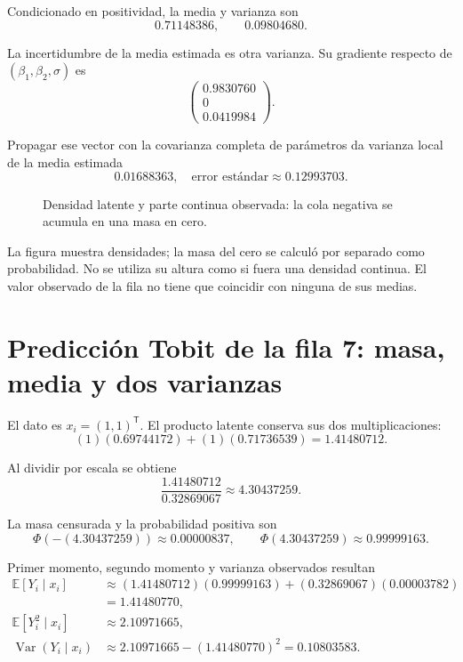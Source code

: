 \documentclass[11pt,a4paper]{article}
\newcommand{\E}{\mathbb E}
\newcommand{\T}{^{\mathsf T}}
\DeclareMathOperator{\Var}{Var}
\begin{document}
Condicionado en positividad,
la media y varianza son
\[
0.71148386,\qquad 0.09804680.
\]

La incertidumbre de la media estimada
es otra varianza.
Su gradiente respecto de
\((\beta_1,\beta_2,\sigma)\) es
\[
\begin{pmatrix}0.9830760\\0\\0.0419984\end{pmatrix}.
\]

Propagar ese vector con la
covarianza completa de parámetros
da varianza local de la
media estimada
\[
0.01688363,\quad\text{error estándar}\approx0.12993703.
\]

\begin{figure}[H]\centering
{}
\caption{Densidad latente y parte continua observada: la cola negativa se acumula en una masa en cero.}
\end{figure}

La figura muestra densidades;
la masa del cero se calculó
por separado como probabilidad.
No se utiliza su altura
como si fuera una densidad continua.
El valor observado de la fila
no tiene que coincidir
con ninguna de sus medias.

\clearpage
\section{Predicción Tobit de la fila 7: masa, media y dos varianzas}\label{unidad117}
El dato es \(x_i=(1,1)\T\).
El producto latente conserva
sus dos multiplicaciones:
\[
(1)(0.69744172)+(1)(0.71736539)=1.41480712.
\]

Al dividir por escala se obtiene
\[
\frac{1.41480712}{0.32869067}\approx4.30437259.
\]

La masa censurada y la
probabilidad positiva son
\[
\Phi(-(4.30437259))\approx0.00000837,\qquad\Phi(4.30437259)\approx0.99999163.
\]

Primer momento, segundo momento
y varianza observados resultan
\[
\begin{aligned}
\E[Y_i\mid x_i]&\approx(1.41480712)(0.99999163)+(0.32869067)(0.00003782)\\
&=1.41480770,\\
\E[Y_i^2\mid x_i]&\approx2.10971665,\\
\Var(Y_i\mid x_i)&\approx2.10971665-(1.41480770)^2=0.10803583.\end{aligned}
\]
\end{document}
